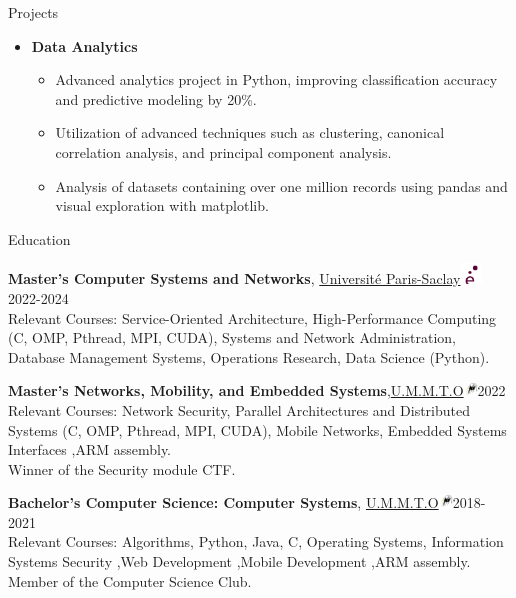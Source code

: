 \documentclass{resume}
\begin{document}
\begin{rSection}{Projects}
\begin{itemize}[leftmargin=*,label= ]
        \item \textbf{\large Data Analytics}
        \begin{itemize}
            \setlength{\itemsep}{-6pt} %
            \item Advanced analytics project in Python, improving classification accuracy and predictive modeling by 20\%.
            \item Utilization of advanced techniques such as clustering, canonical correlation analysis, and principal component analysis.
            \item Analysis of datasets containing over one million records using pandas and visual exploration with matplotlib.
        \end{itemize}
        
    \end{itemize}
\end{rSection}

\vspace{-0.75em}
\begin{rSection}{Education}

    {\large \bf Master's Computer Systems and Networks},  \href{https://www.universite-paris-saclay.fr/}{Université Paris-Saclay\includegraphics[height=1.5em]{../Ressource/petitlogo.png}} \hfill {2022-2024}\\
    Relevant Courses: Service-Oriented Architecture, High-Performance Computing (C, OMP, Pthread, MPI, CUDA), Systems and Network Administration, Database Management Systems, Operations Research, Data Science (Python).
    
    {\large \bf Master's Networks, Mobility, and Embedded Systems},\href{https://www.ummto.dz/}{U.M.M.T.O\includegraphics[height=1em]{../Ressource/ummto.png}}\hfill {2022}\\
    Relevant Courses: Network Security, Parallel Architectures and Distributed Systems (C, OMP, Pthread, MPI, CUDA), Mobile Networks, Embedded Systems Interfaces ,ARM assembly.\\
    Winner of the Security module CTF.
    
    {\large \bf Bachelor's Computer Science: Computer Systems}, \href{https://www.ummto.dz/}{U.M.M.T.O\includegraphics[height=1em]{../Ressource/ummto.png}}\hfill {2018-2021}\\
    Relevant Courses: Algorithms, Python, Java, C, Operating Systems, Information Systems Security ,Web Development ,Mobile Development ,ARM assembly.
    Member of the Computer Science Club.
    \end{rSection}
    \vspace{-0.75em}
\end{document}

